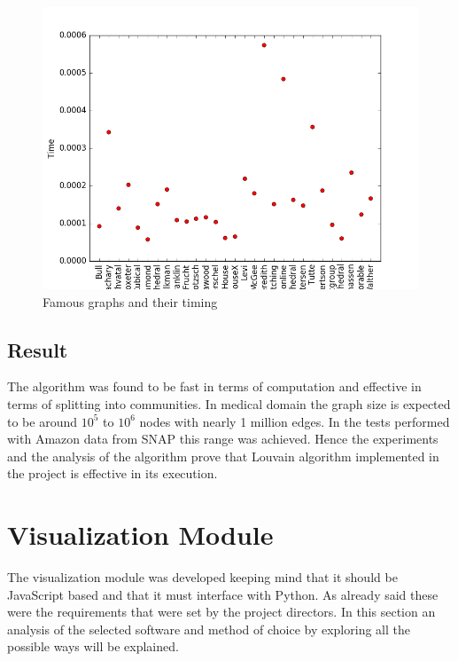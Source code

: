 \begin{figure}[H]
\centering
\includegraphics[scale=0.5]{fam.png}
\caption{Famous graphs and their timing}
\end{figure}

\section{Result}
The algorithm was found to be fast in terms of computation and effective in terms of splitting into communities. In medical domain the graph size is expected to be around $10^5$ to $10^6$ nodes with nearly 1 million edges. In the tests performed with Amazon data from SNAP this range was achieved. Hence the experiments and the analysis of the algorithm prove that Louvain algorithm implemented in the project is effective in its execution.

\chapter{Visualization Module}
The visualization module was developed keeping mind that it should be JavaScript based and that it must interface with Python. 
As already said these were the requirements that were set by the project directors. In this section an analysis of the selected software and method of choice by exploring all the possible ways will be explained. 
